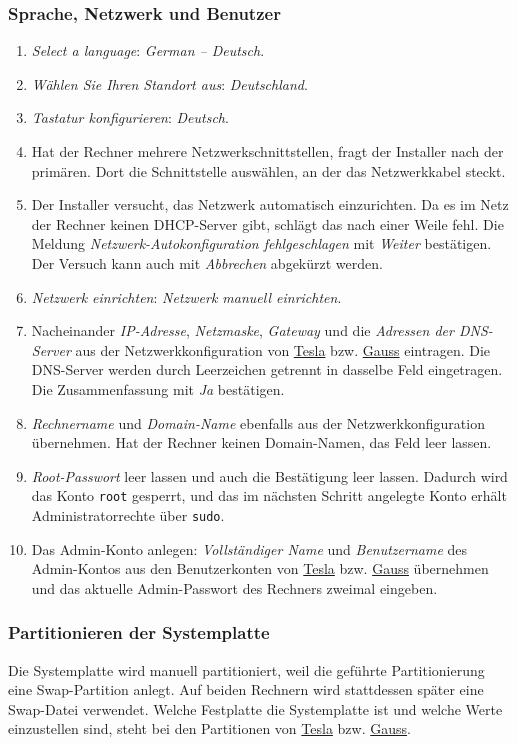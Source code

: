 \subsubsection{Sprache, Netzwerk und Benutzer}
\label{grundsystem-installieren-grundeinstellungen}
\begin{enumerate}
	\item \textit{Select a language}: \textit{German -- Deutsch}.
	\item \textit{Wählen Sie Ihren Standort aus}: \textit{Deutschland}.
	\item \textit{Tastatur konfigurieren}: \textit{Deutsch}.
	\item Hat der Rechner mehrere Netzwerkschnittstellen, fragt der Installer nach der primären. Dort die Schnittstelle auswählen, an der das Netzwerkkabel steckt.
	\item Der Installer versucht, das Netzwerk automatisch einzurichten. Da es im Netz der Rechner keinen DHCP-Server gibt, schlägt das nach einer Weile fehl. Die Meldung \textit{Netzwerk-Autokonfiguration fehlgeschlagen} mit \textit{Weiter} bestätigen. Der Versuch kann auch mit \textit{Abbrechen} abgekürzt werden.
	\item \textit{Netzwerk einrichten}: \textit{Netzwerk manuell einrichten}.
	\item Nacheinander \textit{IP-Adresse}, \textit{Netzmaske}, \textit{Gateway} und die \textit{Adressen der DNS-Server} aus der Netzwerkkonfiguration von \hyperref[tesla-netzwerk]{Tesla} bzw. \hyperref[gauss-netzwerk]{Gauss} eintragen. Die DNS-Server werden durch Leerzeichen getrennt in dasselbe Feld eingetragen. Die Zusammenfassung mit \textit{Ja} bestätigen.
	\item \textit{Rechnername} und \textit{Domain-Name} ebenfalls aus der Netzwerkkonfiguration übernehmen. Hat der Rechner keinen Domain-Namen, das Feld leer lassen.
	\item \textit{Root-Passwort} leer lassen und auch die Bestätigung leer lassen. Dadurch wird das Konto \texttt{root} gesperrt, und das im nächsten Schritt angelegte Konto erhält Administratorrechte über \texttt{sudo}.
	\item Das Admin-Konto anlegen: \textit{Vollständiger Name} und \textit{Benutzername} des Admin-Kontos aus den Benutzerkonten von \hyperref[tesla-benutzer]{Tesla} bzw. \hyperref[gauss-benutzer]{Gauss} übernehmen und das aktuelle Admin-Passwort des Rechners zweimal eingeben.
\end{enumerate}

\subsubsection{Partitionieren der Systemplatte}
\label{grundsystem-installieren-partitionieren}
Die Systemplatte wird manuell partitioniert, weil die geführte Partitionierung eine Swap-Partition anlegt. Auf beiden Rechnern wird stattdessen später eine Swap-Datei verwendet. Welche Festplatte die Systemplatte ist und welche Werte einzustellen sind, steht bei den Partitionen von \hyperref[tesla-partitionen]{Tesla} bzw. \hyperref[gauss-partitionen]{Gauss}.

